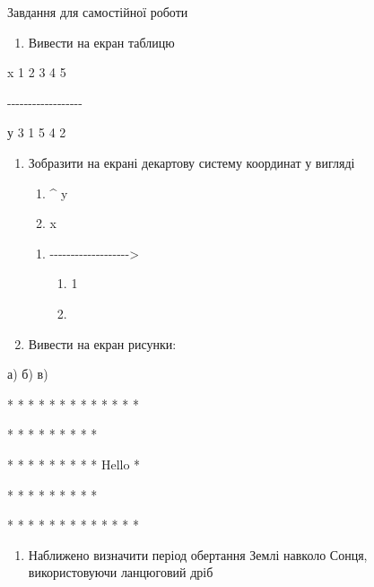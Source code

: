 \documentclass[]{article}
\begin{document}
Завдання для самостійної роботи

\begin{enumerate}
\def\labelenumi{\arabic{enumi}.}
\item
  Вивести на екран таблицю
\end{enumerate}

x \textbar{} 1 \textbar{} 2 \textbar{} 3 \textbar{} 4 \textbar{} 5

-\/-\/-\/-\/-\/-\/-\/-\/-\/-\/-\/-\/-\/-\/-\/-\/-\/-

у \textbar{} 3 \textbar{} 1 \textbar{} 5 \textbar{} 4 \textbar{} 2

\begin{enumerate}
\def\labelenumi{\arabic{enumi}.}
\item
  Зобразити на екрані декартову систему координат у вигляді

  \begin{enumerate}
  \def\labelenumii{\roman{enumii}.}
  \item
    \^{} y
  \item
    \textbar{} x
  \end{enumerate}

  \begin{enumerate}
  \def\labelenumii{\alph{enumii}.}
  \item
    -\/-\/-\/-\/-\/-\/-\/-\/-\/-\/-\/-\/-\/-\/-\/-\/-\/-\/-\textgreater{}

    \begin{enumerate}
    \def\labelenumiii{\roman{enumiii}.}
    \item
      \textbar{} 1
    \item
      \textbar{}
    \end{enumerate}
  \end{enumerate}
\item
  Вивести на екран рисунки:
\end{enumerate}

а) б) в)

* * * * * * * * * * * * *

* * * * * * * * *

* * * * * * * * * Hello *

* * * * * * * * *

* * * * * * * * * * * * *

\begin{enumerate}
\def\labelenumi{\arabic{enumi}.}
\item
  Наближено визначити період обертання Землі навколо Сонця,
  використовуючи ланцюговий дріб
\end{enumerate}
\end{document}

